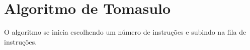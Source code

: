 \section{Algoritmo de Tomasulo}

O algoritmo se inicia escolhendo um número de instruções
e subindo na fila de instruções.